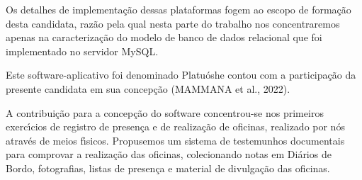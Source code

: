 \documentclass[
12pt,		%
openright,	%
twoside,  %
a4paper,			%
chapter=TITLE,		%
english,			%
french,				%
spanish,			%
brazil				%
]{USPSC-classe/USPSC_RedarTex}
\begin{document}
Os detalhes de implementa\c{c}\~ao dessas plataformas fogem ao escopo de forma\c{c}\~ao desta candidata, raz\~ao pela qual nesta parte do trabalho nos concentraremos apenas na caracteriza\c{c}\~ao do modelo de banco de dados relacional que foi implementado no servidor MySQL.










Este software-aplicativo foi denominado \textquotedbl Platu\'osh\textquotedbl  e contou com a participa\c{c}\~ao da presente candidata em sua concep\c{c}\~ao  (MAMMANA et al., 2022).










A contribui\c{c}\~ao para a concep\c{c}\~ao do software concentrou-se nos primeiros exerc\'{\i}cios de registro de presen\c{c}a e de realiza\c{c}\~ao de oficinas, realizado por n\'os atrav\'es de meios f\'{\i}sicos. Propusemos um sistema de testemunhos documentais para comprovar a realiza\c{c}\~ao das oficinas, colecionando notas em Di\'arios de Bordo, fotografias, listas de presen\c{c}a e material de divulga\c{c}\~ao das oficinas.
\end{document}
